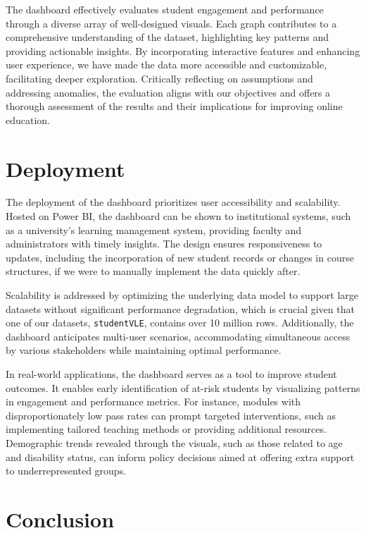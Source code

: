 The dashboard effectively evaluates student engagement and performance through a diverse array of well-designed visuals. Each graph contributes to a comprehensive understanding of the dataset, highlighting key patterns and providing actionable insights. By incorporating interactive features and enhancing user experience, we have made the data more accessible and customizable, facilitating deeper exploration. Critically reflecting on assumptions and addressing anomalies, the evaluation aligns with our objectives and offers a thorough assessment of the results and their implications for improving online education.

\section{Deployment}

The deployment of the dashboard prioritizes user accessibility and scalability. Hosted on Power BI, the dashboard can be shown to institutional systems, such as a university's learning management system, providing faculty and administrators with timely insights. The design ensures responsiveness to updates, including the incorporation of new student records or changes in course structures, if we were to manually implement the data quickly after.

Scalability is addressed by optimizing the underlying data model to support large datasets without significant performance degradation, which is crucial given that one of our datasets, \texttt{studentVLE}, contains over 10 million rows. Additionally, the dashboard anticipates multi-user scenarios, accommodating simultaneous access by various stakeholders while maintaining optimal performance. 

In real-world applications, the dashboard serves as a tool to improve student outcomes. It enables early identification of at-risk students by visualizing patterns in engagement and performance metrics. For instance, modules with disproportionately low pass rates can prompt targeted interventions, such as implementing tailored teaching methods or providing additional resources. Demographic trends revealed through the visuals, such as those related to age and disability status, can inform policy decisions aimed at offering extra support to underrepresented groups.

\section{Conclusion}


